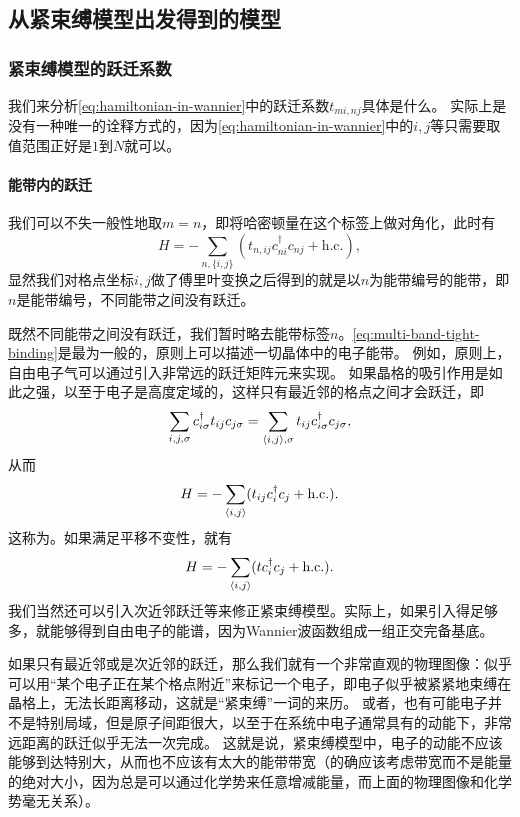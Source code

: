 \subsection{从紧束缚模型出发得到的模型}

\subsubsection{紧束缚模型的跃迁系数}\label{sec:tight-binding-hopping}

我们来分析\eqref{eq:hamiltonian-in-wannier}中的跃迁系数$t_{mi, nj}$具体是什么。
实际上是没有一种唯一的诠释方式的，因为\eqref{eq:hamiltonian-in-wannier}中的$i, j$等只需要取值范围正好是$1$到$N$就可以。

\paragraph{能带内的跃迁} 我们可以不失一般性地取$m = n$，即将哈密顿量在这个标签上做对角化，此时有
\begin{equation}
    {H} = - \sum_{n, \{i, j\}} (t_{n, ij} {c}_{ni}^\dagger {c}_{nj} + \text{h.c.}),
    \label{eq:multi-band-tight-binding}
\end{equation}
显然我们对格点坐标$i, j$做了傅里叶变换之后得到的就是以$n$为能带编号的能带，即$n$是能带编号，不同能带之间没有跃迁。

既然不同能带之间没有跃迁，我们暂时略去能带标签$n$。\eqref{eq:multi-band-tight-binding}是最为一般的，原则上可以描述一切晶体中的电子能带。
例如，原则上，自由电子气可以通过引入非常远的跃迁矩阵元来实现。
如果晶格的吸引作用是如此之强，以至于电子是高度定域的，这样只有最近邻的格点之间才会跃迁，即
\[
    \sum_{i, j, \sigma} c^\dagger_{i \sigma} t_{i j} c_{j \sigma} = \sum_{\langle i, j \rangle, \sigma} t_{ij} c^\dagger_{i \sigma} c_{j \sigma},
\]
从而
\begin{equation}
    {H} = - \sum_{\langle i, j \rangle} (t_{ij} {c}^\dagger_i {c}_j + \text{h.c.}).
\end{equation}
这称为。如果满足平移不变性，就有
\begin{equation}
    {H} = - \sum_{\langle i, j \rangle} (t {c}^\dagger_i {c}_j + \text{h.c.}).
\end{equation}
我们当然还可以引入次近邻跃迁等来修正紧束缚模型。实际上，如果引入得足够多，就能够得到自由电子的能谱，因为Wannier波函数组成一组正交完备基底。

如果只有最近邻或是次近邻的跃迁，那么我们就有一个非常直观的物理图像：似乎可以用“某个电子正在某个格点附近”来标记一个电子，即电子似乎被紧紧地束缚在晶格上，无法长距离移动，这就是“紧束缚”一词的来历。
或者，也有可能电子并不是特别局域，但是原子间距很大，以至于在系统中电子通常具有的动能下，非常远距离的跃迁似乎无法一次完成。
这就是说，紧束缚模型中，电子的动能不应该能够到达特别大，从而也不应该有太大的能带带宽（的确应该考虑带宽而不是能量的绝对大小，因为总是可以通过化学势来任意增减能量，而上面的物理图像和化学势毫无关系）。

